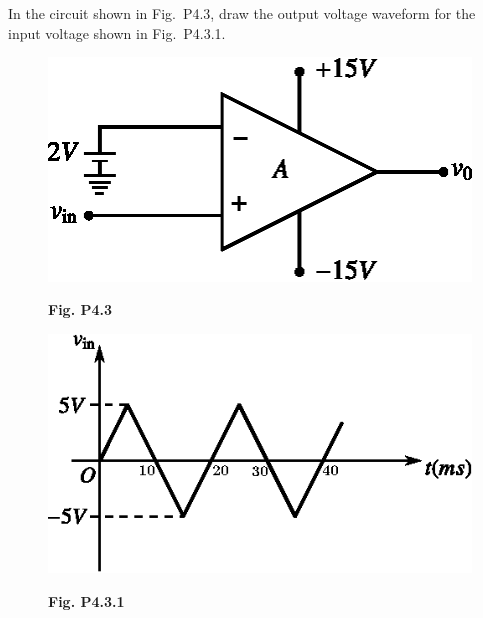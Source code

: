 \begin{problem}\label{prob4.3}
In the circuit shown in Fig.~P4.3, draw the output voltage waveform for the input voltage shown in Fig.~P4.3.1.
\begin{figure}[H]
\centering
\includegraphics{chap4/figP4.3.eps}

\smallskip
{\bf Fig. P4.3}
\end{figure}
\begin{figure}[H]
\centering
\includegraphics{chap4/figP4.3.1.eps}

\smallskip
{\bf Fig. P4.3.1}
\end{figure}
\end{problem}

